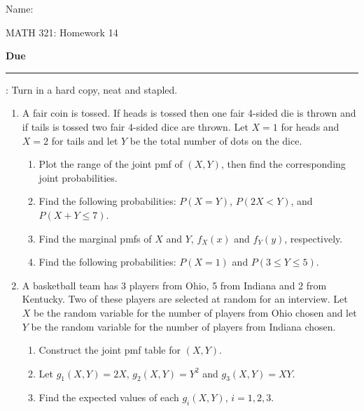 \documentclass{article}
\newcommand{\blankul}[1]{\rule[-1.5mm]{#1}{0.15mm}}	%
\begin{document}
\hspace{375pt}Name:

\begin{center}
{\Huge MATH 321: Homework 14}
\end{center}

\bigskip\bigskip

{\large \textbf{Due} \blankul{4cm}: Turn in a hard copy, neat and stapled.}\bigskip


\begin{enumerate}
    \item A fair coin is tossed. If heads is tossed then one fair 4-sided die is thrown and if tails is tossed two fair 4-sided dice are thrown. Let $X = 1$ for heads and $X = 2$ for tails and let $Y$ be the total number of dots on the dice.%
    \begin{enumerate}
        \item Plot the range of the joint pmf of $(X,Y)$, then find the corresponding joint probabilities.
        \item Find the following probabilities: $P(X = Y)$, $P(2X < Y)$, and $P(X + Y \le 7)$. 
        \item Find the marginal pmfs of $X$ and $Y$, $f_X(x)$ and $f_Y(y)$, respectively.
        \item Find the following probabilities: $P(X = 1)$ and $P(3 \le Y \le 5)$.
    \end{enumerate}\bigskip
    
    \item A basketball team has 3 players from Ohio, 5 from Indiana and 2 from Kentucky. Two of these players are selected at random for an interview. Let $X$ be the random variable for the number of players from Ohio chosen and let $Y$ be the random variable for the number of players from Indiana chosen.%
    \begin{enumerate}
        \item Construct the joint pmf table for $(X,Y)$.
        \item Let $g_1(X,Y) = 2X$, $g_2(X,Y) = Y^2$ and $g_3(X,Y) = XY$.
        \item[] Find the expected values of each $g_i(X,Y)$, $i = 1, 2, 3$.%
    \end{enumerate}\bigskip
    

\end{enumerate}
\end{document}
